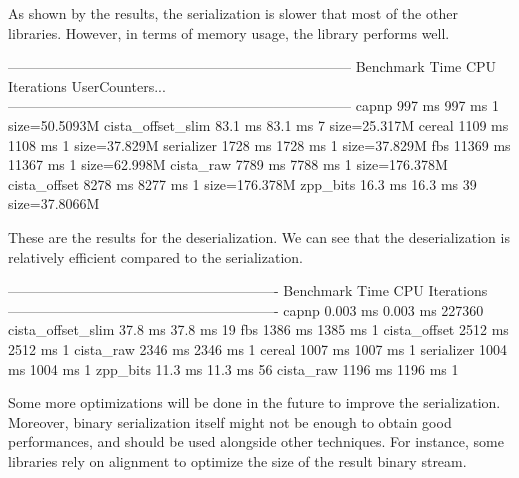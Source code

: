 As shown by the results, the serialization is slower that most of the other
libraries. However, in terms of memory usage, the library performs well.

\begin{terminal}
--------------------------------------------------------------------------
Benchmark                Time             CPU   Iterations UserCounters...
--------------------------------------------------------------------------
capnp                  997 ms          997 ms            1 size=50.5093M
cista_offset_slim     83.1 ms         83.1 ms            7 size=25.317M
cereal                1109 ms         1108 ms            1 size=37.829M
serializer            1728 ms         1728 ms            1 size=37.829M
fbs                  11369 ms        11367 ms            1 size=62.998M
cista_raw             7789 ms         7788 ms            1 size=176.378M
cista_offset          8278 ms         8277 ms            1 size=176.378M
zpp_bits              16.3 ms         16.3 ms           39 size=37.8066M
\end{terminal}\leavevmode\newline

These are the results for the deserialization. We can see that the
deserialization is relatively efficient compared to the serialization.

\begin{terminal}
----------------------------------------------------------
Benchmark                Time             CPU   Iterations
----------------------------------------------------------
capnp                0.003 ms        0.003 ms       227360
cista_offset_slim     37.8 ms         37.8 ms           19
fbs                   1386 ms         1385 ms            1
cista_offset          2512 ms         2512 ms            1
cista_raw             2346 ms         2346 ms            1
cereal                1007 ms         1007 ms            1
serializer            1004 ms         1004 ms            1
zpp_bits              11.3 ms         11.3 ms           56
cista_raw             1196 ms         1196 ms            1
\end{terminal}\leavevmode\newline

Some more optimizations will be done in the future to improve the serialization.
Moreover, binary serialization itself might not be enough to obtain good
performances, and should be used alongside other techniques. For instance, some
libraries rely on alignment to optimize the size of the result binary stream.

